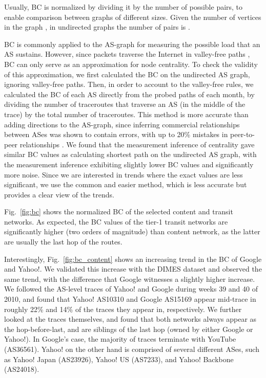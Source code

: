 \documentclass[conference]{IEEEtran}
\newcommand{\figref}[1]{Fig.~\ref{#1}}
\begin{document}
Usually, BC is normalized by dividing it by the number of possible pairs,
to enable comparison between graphs of different sizes. Given
the number of vertices in the graph , in undirected graphs the number of pairs
is .



BC is commonly applied to the AS-graph for measuring
the possible load that an AS sustains. However, since packets traverse the Internet in valley-free paths \cite{gao01},
BC can only serve as an approximation for node centrality. To check the validity of this approximation, we 
first calculated the BC on the undirected AS graph, ignoring valley-free paths.
Then, in order to account to the valley-free rules, we calculated the BC of each AS directly from the probed paths of each month, by dividing
the number of traceroutes that traverse an AS (in the middle of the trace) by the total number of traceroutes. This method
is more accurate than adding directions to the AS-graph, since inferring commercial relationships between ASes was
shown to contain errors, with up to 20\% mistakes in peer-to-peer relationships \cite{XiaGao04,dimitropoulos-2006-37}. 
We found that the measurement inference of centrality gave similar BC values
as calculating shortest path on the undirected AS graph, with the measurement inference exhibiting slightly lower BC values and significantly more noise. Since we are interested in trends where the exact
values are less significant, we
use the common and easier method, which is less accurate but provides a clear view of the trends.

\figref{fig:bc} shows the normalized BC of the selected content and transit networks. As expected,
the BC values of the tier-1 transit networks are significantly higher (two orders of magnitude)
than content network, as the latter are usually the last hop of the routes.

Interestingly, \figref{fig:bc_content} shows an increasing trend in the BC of Google and Yahoo!.
We validated this increase with the DIMES dataset and observed the same trend, with the
difference that Google witnesses a slightly higher increase. We followed the
AS-level traces of Yahoo! and Google during weeks 39 and 40 of 2010, and found that
Yahoo! AS10310 and Google AS15169 appear mid-trace in roughly 22\% and 14\% of
the traces they appear in, respectively. We further looked at the traces themselves,
and found that both networks always appear as the hop-before-last, and are siblings
of the last hop (owned by either Google or Yahoo!). In Google's case, the majority of traces terminate with YouTube (AS36561).
Yahoo! on the other hand is comprised of several different ASes,
such as Yahoo! Japan (AS23926), Yahoo! US (AS7233), and Yahoo! Backbone (AS24018).
\end{document}
